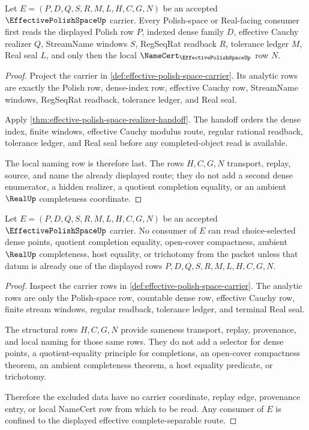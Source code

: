 \begin{theorem}\label{thm:effective-polish-space-dense-realizer-consumer-route}
Let $E=(P,D,Q,S,R,M,L,H,C,G,N)$ be an accepted $\EffectivePolishSpaceUp$ carrier. Every Polish-space or Real-facing consumer first reads the displayed Polish row $P$, indexed dense family $D$, effective Cauchy realizer $Q$, StreamName windows $S$, RegSeqRat readback $R$, tolerance ledger $M$, Real seal $L$, and only then the local $\NameCert_{\EffectivePolishSpaceUp}$ row $N$.
\end{theorem}
\begin{proof}
Project the carrier in \autoref{def:effective-polish-space-carrier}. Its analytic rows are exactly the Polish row, dense-index row, effective Cauchy row, StreamName windows, RegSeqRat readback, tolerance ledger, and Real seal.

Apply \autoref{thm:effective-polish-space-realizer-handoff}. The handoff orders the dense index, finite windows, effective Cauchy modulus route, regular rational readback, tolerance ledger, and Real seal before any completed-object read is available.

The local naming row is therefore last. The rows $H,C,G,N$ transport, replay, source, and name the already displayed route; they do not add a second dense enumerator, a hidden realizer, a quotient completion equality, or an ambient $\RealUp$ completeness coordinate.
\end{proof}

\begin{theorem}\label{thm:effective-polish-space-nonescape}
Let $E=(P,D,Q,S,R,M,L,H,C,G,N)$ be an accepted $\EffectivePolishSpaceUp$ carrier. No consumer of $E$ can read choice-selected dense points, quotient completion equality, open-cover compactness, ambient $\RealUp$ completeness, host equality, or trichotomy from the packet unless that datum is already one of the displayed rows $P,D,Q,S,R,M,L,H,C,G,N$.
\end{theorem}
\begin{proof}
Inspect the carrier rows in \autoref{def:effective-polish-space-carrier}. The analytic rows are only the Polish-space row, countable dense row, effective Cauchy row, finite stream windows, regular readback, tolerance ledger, and terminal Real seal.

The structural rows $H,C,G,N$ provide sameness transport, replay, provenance, and local naming for those same rows. They do not add a selector for dense points, a quotient-equality principle for completions, an open-cover compactness theorem, an ambient completeness theorem, a host equality predicate, or trichotomy.

Therefore the excluded data have no carrier coordinate, replay edge, provenance entry, or local NameCert row from which to be read. Any consumer of $E$ is confined to the displayed effective complete-separable route.
\end{proof}

